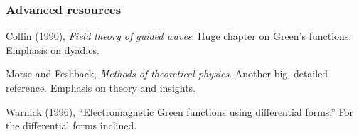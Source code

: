 \documentclass[12 pt, compress, handout, intlimits]{beamer}
\begin{document}
\note{}

\begin{frame}[fragile]
    \frametitle{Advanced resources}
    Collin (1990), \emph{Field theory of guided waves}. 
    Huge chapter on Green's functions. Emphasis on dyadics.

    Morse and Feshback, \emph{Methods of theoretical physics}.
    Another big, detailed reference. Emphasis on theory and insights.

    Warnick (1996), ``Electromagnetic Green functions using differential forms.''
    For the differential forms inclined.

\end{frame}    

\note{}
\end{document}
